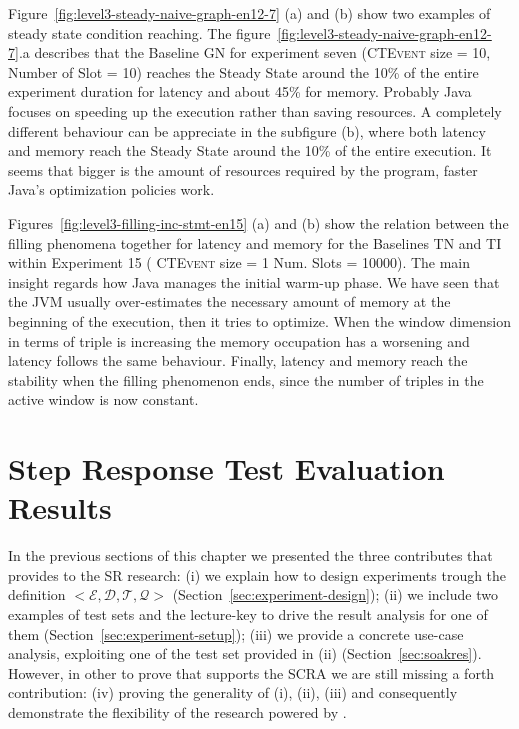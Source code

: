 Figure~\ref{fig:level3-steady-naive-graph-en12-7} (a) and (b) show two examples of steady state condition reaching. The figure~\ref{fig:level3-steady-naive-graph-en12-7}.a describes that the Baseline GN for experiment seven (\textsc{CTEvent} size = 10, Number of Slot = 10) reaches the Steady State around the 10\% of the entire experiment duration for latency and about 45\% for memory. 
Probably Java focuses on speeding up the execution rather than saving resources. A completely different behaviour can be appreciate in the subfigure (b), where both latency and memory reach the Steady State around the 10\% of the entire execution. It seems that bigger is the amount of resources required by the program, faster Java's optimization policies work.

Figures~\ref{fig:level3-filling-inc-stmt-en15} (a) and (b) show the relation between the filling phenomena together for latency and memory for the Baselines TN and TI within Experiment 15 ( \textsc{CTEvent} size = 1 Num. Slots = 10000). The main insight regards how Java manages the initial warm-up phase. We have seen that the JVM usually over-estimates the necessary amount of memory at the beginning of the execution, then it tries to optimize. When the window dimension in terms of triple is increasing the memory occupation has a worsening and latency follows the same behaviour. Finally, latency and memory reach the stability when the filling phenomenon ends, since the number of triples in the active window is now constant.















\pagebreak

\section{Step Response Test Evaluation Results}\label{sec:stressres}

In the previous sections of this chapter we presented the three contributes that \name provides to the SR research: (i) we explain how to design experiments trough the \name definition $<\mathcal{E},\mathcal{D},\mathcal{T},\mathcal{Q}>$ (Section~\ref{sec:experiment-design}); (ii) we include two examples of test sets and the lecture-key to drive the result analysis for one of them (Section~\ref{sec:experiment-setup}); (iii) we provide a concrete use-case analysis, exploiting one of the test set provided in (ii) (Section~\ref{sec:soakres}). However, in other to prove that \name supports the SCRA we are still missing a forth contribution: (iv) proving the generality of (i), (ii), (iii) and consequently demonstrate the flexibility of the research powered by \namens.

